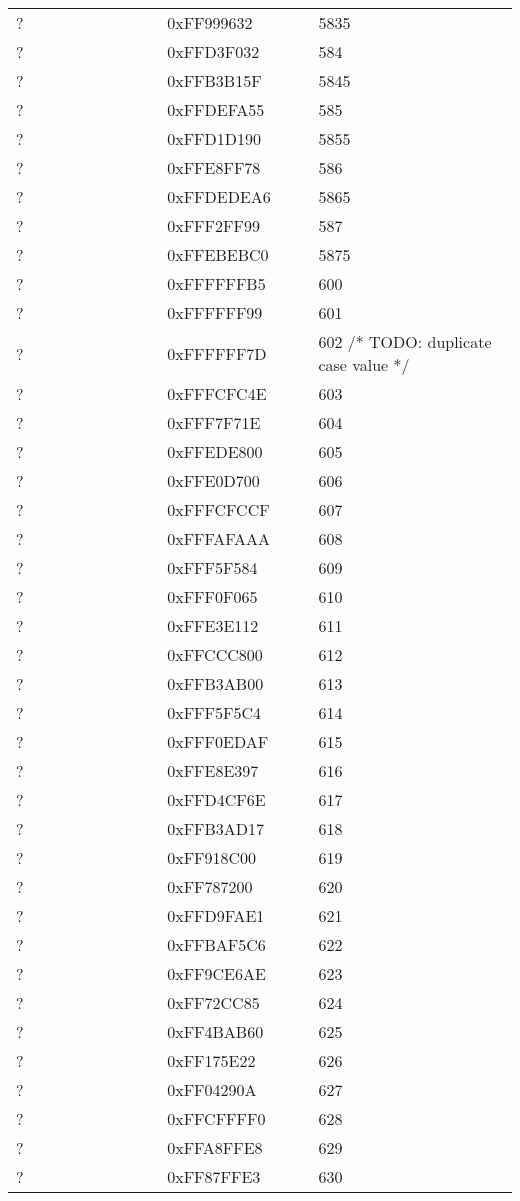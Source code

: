 \begin{longtable}{p{0.3\linewidth} p{0.3\linewidth} p{0.4\linewidth}}
? &  0xFF999632 &  5835\\
? &  0xFFD3F032 &  584\\
? &  0xFFB3B15F &  5845\\
? &  0xFFDEFA55 &  585\\
? &  0xFFD1D190 &  5855\\
? &  0xFFE8FF78 &  586\\
? &  0xFFDEDEA6 &  5865\\
? &  0xFFF2FF99 &  587\\
? &  0xFFEBEBC0 &  5875\\
? &  0xFFFFFFB5 &  600\\
? &  0xFFFFFF99 &  601\\
? &  0xFFFFFF7D &  602 /* TODO: duplicate case value */\\
? &  0xFFFCFC4E &  603\\
? &  0xFFF7F71E &  604\\
? &  0xFFEDE800 &  605\\
? &  0xFFE0D700 &  606\\
? &  0xFFFCFCCF &  607\\
? &  0xFFFAFAAA &  608\\
? &  0xFFF5F584 &  609\\
? &  0xFFF0F065 &  610\\
? &  0xFFE3E112 &  611\\
? &  0xFFCCC800 &  612\\
? &  0xFFB3AB00 &  613\\
? &  0xFFF5F5C4 &  614\\
? &  0xFFF0EDAF &  615\\
? &  0xFFE8E397 &  616\\
? &  0xFFD4CF6E &  617\\
? &  0xFFB3AD17 &  618\\
? &  0xFF918C00 &  619\\
? &  0xFF787200 &  620\\
? &  0xFFD9FAE1 &  621\\
? &  0xFFBAF5C6 &  622\\
? &  0xFF9CE6AE &  623\\
? &  0xFF72CC85 &  624\\
? &  0xFF4BAB60 &  625\\
? &  0xFF175E22 &  626\\
? &  0xFF04290A &  627\\
? &  0xFFCFFFF0 &  628\\
? &  0xFFA8FFE8 &  629\\
? &  0xFF87FFE3 &  630\\

\end{longtable}
